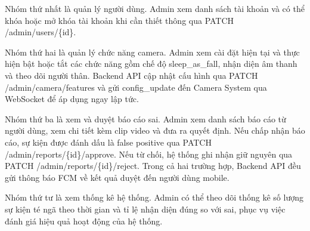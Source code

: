 Nhóm thứ nhất là quản lý người dùng. Admin xem danh sách tài khoản và có thể khóa hoặc
mở khóa tài khoản khi cần thiết thông qua PATCH /admin/users/\{id\}.

Nhóm thứ hai là quản lý chức năng camera. Admin xem cài đặt hiện tại và thực hiện
bật hoặc tắt các chức năng gồm chế độ sleep\_as\_fall, nhận diện âm thanh và theo dõi
người thân. Backend API cập nhật cấu hình qua PATCH /admin/camera/features và
gửi config\_update đến Camera System qua WebSocket để áp dụng ngay lập tức.

Nhóm thứ ba là xem và duyệt báo cáo sai. Admin xem danh sách báo cáo từ người dùng,
xem chi tiết kèm clip video và đưa ra quyết định. Nếu chấp nhận báo cáo, sự kiện được
đánh dấu là false positive qua PATCH /admin/reports/\{id\}/approve. Nếu từ
chối, hệ thống ghi nhận giữ nguyên qua PATCH /admin/reports/\{id\}/reject.
Trong cả hai trường hợp, Backend API đều gửi thông báo FCM về kết quả duyệt đến người
dùng mobile.

Nhóm thứ tư là xem thống kê hệ thống. Admin có thể theo dõi thống kê số lượng sự kiện
té ngã theo thời gian và tỉ lệ nhận diện đúng so với sai, phục vụ việc đánh giá hiệu
quả hoạt động của hệ thống.
